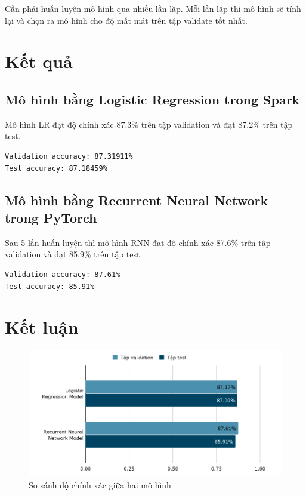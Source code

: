 \documentclass[runningheads]{llncs}
\begin{document}
Cần phải huấn luyện mô hình qua nhiều lần lặp. Mỗi lần lặp thì mô hình sẽ tính lại và chọn ra mô hình cho độ mất mát trên tập validate tốt nhất.

\section{Kết quả}

\subsection{Mô hình bằng Logistic Regression trong Spark}

Mô hình LR đạt độ chính xác 87.3\% trên tập validation và đạt 87.2\% trên tập test.

\begin{lstlisting}
Validation accuracy: 87.31911%
Test accuracy: 87.18459%
\end{lstlisting}

\subsection{Mô hình bằng Recurrent Neural Network trong PyTorch}

Sau 5 lần huấn luyện thì mô hình RNN đạt độ chính xác 87.6\% trên tập validation và đạt 85.9\% trên tập test.

\begin{lstlisting}
Validation accuracy: 87.61%
Test accuracy: 85.91%
\end{lstlisting}

\section{Kết luận}

\begin{figure}
\includegraphics[width=\textwidth]{compare.png}
\caption{So sánh độ chính xác giữa hai mô hình \label{figCompare}}
\end{figure}
\end{document}
